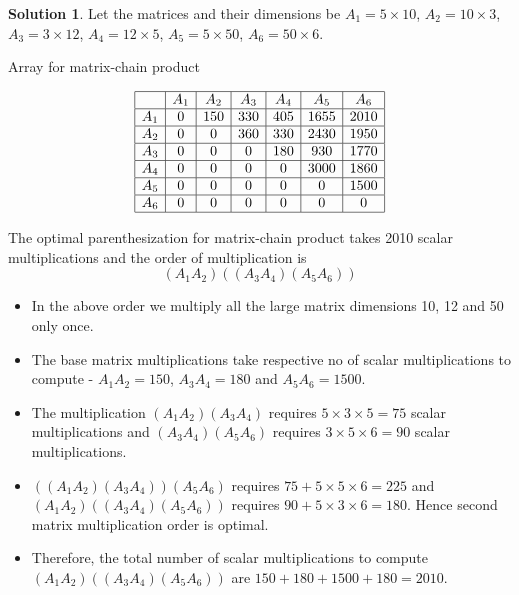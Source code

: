 \documentclass{article}
\theoremstyle{definition}
\newtheorem*{solution}{Solution}
\begin{document}
\begin{solution}
Let the matrices and their dimensions be $A_1 = 5\times10$, $A_2 = 10\times3$, $A_3 = 3\times12$, $A_4 = 12\times5$, $A_5 = 5\times50$, $A_6 = 50\times6$.

\begin{table}[htbp]
    \caption{Array for matrix-chain product}
    \centering
    \begin{equation*}
        \begin{array}{|c|c|c|c|c|c|c|}
            \hline
            & A_1 & A_2 & A_3 & A_4 & A_5 & A_6 \\
            \hline
            A_1 & 0 & 150 & 330 & 405 & 1655 & 2010\\
            \hline
            A_2 & 0 & 0 & 360 & 330 & 2430 & 1950\\
            \hline
            A_3 & 0 & 0 & 0 & 180 & 930 & 1770\\
            \hline
            A_4 & 0 & 0 & 0 & 0 & 3000 & 1860\\
            \hline
            A_5 & 0 & 0 & 0 & 0 & 0 & 1500\\
            \hline
            A_6 & 0 & 0 & 0 & 0 & 0 & 0\\
            \hline
        \end{array}
    \end{equation*}
\end{table}
The optimal parenthesization for matrix-chain product takes 2010 scalar multiplications and the order of multiplication is 
$$(A_1A_2)((A_3A_4)(A_5A_6))$$
\begin{itemize}
    \item In the above order we multiply all the large matrix dimensions 10, 12 and 50 only once.
    \item The base matrix multiplications take respective no of scalar multiplications to compute - $A_1A_2 = 150$, $A_3A_4 = 180$ and $A_5A_6 = 1500$.
    \item The multiplication $(A_1A_2)(A_3A_4)$ requires $5\times3\times5 = 75$ scalar multiplications and $(A_3A_4)(A_5A_6)$ requires $3\times5\times6 = 90$ scalar multiplications.
    \item $((A_1A_2)(A_3A_4))(A_5A_6)$ requires $75 + 5\times5\times6 = 225$ and $(A_1A_2)((A_3A_4)(A_5A_6))$ requires $90 + 5\times3\times6 = 180$. Hence second matrix multiplication order is optimal.
    \item Therefore, the total number of scalar multiplications to compute $(A_1A_2)((A_3A_4)(A_5A_6))$ are $150 + 180 + 1500 + 180 = 2010$.
\end{itemize}
\end{solution}
\newpage
\end{document}
